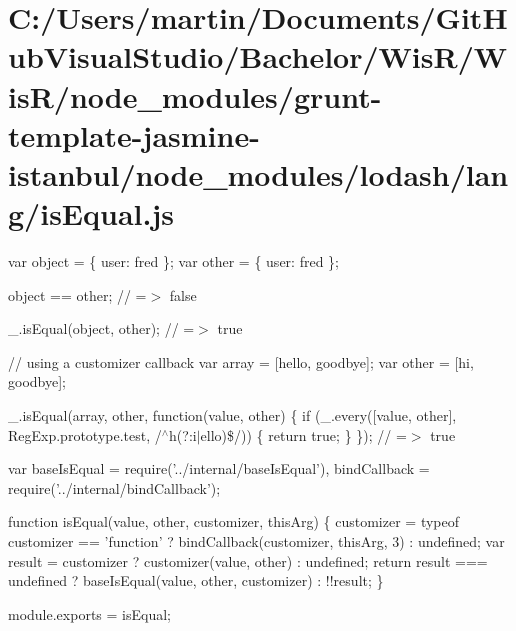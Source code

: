 \hypertarget{_c_1_2_users_2martin_2_documents_2_git_hub_visual_studio_2_bachelor_2_wis_r_2_wis_r_2node_module52ed6492123aa1b0a628958c2d83a151}{}\section{C\+:/\+Users/martin/\+Documents/\+Git\+Hub\+Visual\+Studio/\+Bachelor/\+Wis\+R/\+Wis\+R/node\+\_\+modules/grunt-\/template-\/jasmine-\/istanbul/node\+\_\+modules/lodash/lang/is\+Equal.\+js}
var object = \{ \textquotesingle{}user\textquotesingle{}\+: \textquotesingle{}fred\textquotesingle{} \}; var other = \{ \textquotesingle{}user\textquotesingle{}\+: \textquotesingle{}fred\textquotesingle{} \};

object == other; // =$>$ false

\+\_\+.\+is\+Equal(object, other); // =$>$ true

// using a customizer callback var array = \mbox{[}\textquotesingle{}hello\textquotesingle{}, \textquotesingle{}goodbye\textquotesingle{}\mbox{]}; var other = \mbox{[}\textquotesingle{}hi\textquotesingle{}, \textquotesingle{}goodbye\textquotesingle{}\mbox{]};

\+\_\+.\+is\+Equal(array, other, function(value, other) \{ if (\+\_\+.\+every(\mbox{[}value, other\mbox{]}, Reg\+Exp.\+prototype.\+test, /$^\wedge$h(?\+:i$\vert$ello)\$/)) \{ return true; \} \}); // =$>$ true


\begin{DoxyCodeInclude}
var baseIsEqual = require(\textcolor{stringliteral}{'../internal/baseIsEqual'}),
    bindCallback = require(\textcolor{stringliteral}{'../internal/bindCallback'});

\textcolor{keyword}{function} isEqual(value, other, customizer, thisArg) \{
  customizer = typeof customizer == \textcolor{stringliteral}{'function'} ? bindCallback(customizer, thisArg, 3) : undefined;
  var result = customizer ? customizer(value, other) : undefined;
  \textcolor{keywordflow}{return}  result === undefined ? baseIsEqual(value, other, customizer) : !!result;
\}

module.exports = isEqual;
\end{DoxyCodeInclude}
 